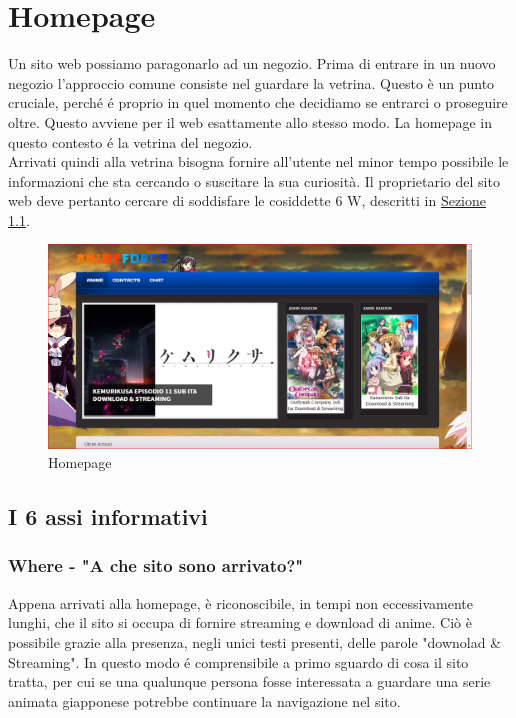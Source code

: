 \section{Homepage} \label{Homepage}
Un sito web possiamo paragonarlo ad un negozio. Prima di entrare in un nuovo negozio l’approccio comune consiste nel guardare la vetrina. Questo è un punto cruciale, perché é proprio in quel momento che decidiamo se entrarci o proseguire oltre. Questo avviene per il web esattamente allo stesso modo. La homepage in questo contesto é la vetrina del negozio. \\
Arrivati quindi alla vetrina bisogna fornire all'utente nel minor tempo possibile le informazioni che sta cercando o  suscitare la sua curiosità. Il proprietario del sito web deve pertanto cercare di soddisfare le cosiddette 6 W, descritti in \hyperref[Assi informativi]{Sezione \ref{Assi informativi}}. 

\begin{figure}[H]
	\centering 
	\includegraphics[width=1\textwidth]{img/homepage01.png}
	\caption{Homepage} 
	\label{img1} 
\end{figure}

\subsection{I 6 assi informativi} \label{Assi informativi}

\subsubsection{Where - "A che sito sono arrivato?"} \label{HWhere}
Appena arrivati alla homepage, è riconoscibile,  in tempi non eccessivamente lunghi, che il sito si occupa di fornire streaming e download di anime. Ciò è possibile grazie alla presenza, negli unici testi presenti, delle parole "downolad \& Streaming". In questo modo é comprensibile a primo sguardo di cosa il sito tratta, per cui se una qualunque persona fosse interessata a guardare una serie animata giapponese potrebbe continuare la navigazione nel sito.

